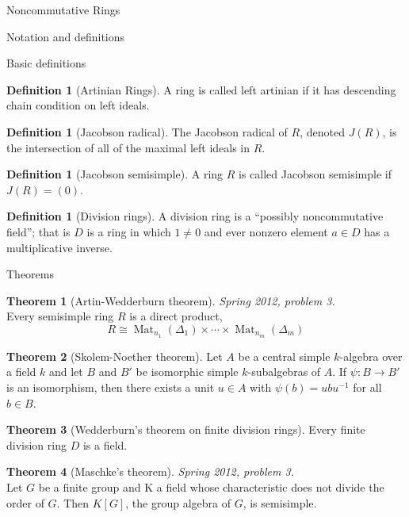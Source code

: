 \documentclass{article}
\theoremstyle{definition}
\newtheorem{theorem}{Theorem}
\numberwithin{theorem}{subsection} %
\theoremstyle{remark}
\theoremstyle{definition}
\newtheorem{definition}[paragraph]{Definition}
\newcommand{\Mat}{\operatorname{Mat}}
\newcommand{\fn}[3]{{#1 \colon #2 \rightarrow #3}}
\begin{document}
\pagebreak
\begin{section}{Noncommutative Rings}
  \begin{subsection}{Notation and definitions}
    \begin{subsubsection}{Basic definitions}
      \begin{definition}[Artinian Rings]
        A ring is called left artinian if it has descending chain condition on
        left ideals.
      \end{definition}
      \begin{definition}[Jacobson radical]
        The Jacobson radical of $R$, denoted $J(R)$, is the intersection of all
        of the maximal left ideals in $R$.
      \end{definition}
      \begin{definition}[Jacobson semisimple]
        A ring $R$ is called Jacobson semisimple if $J(R) = (0)$.
      \end{definition}
      \begin{definition}[Division rings]
        A division ring is a ``possibly noncommutative field''; that is $D$ is a
        ring in which $1 \neq 0$ and ever nonzero element $a \in D$ has a
        multiplicative inverse.
      \end{definition}
    \end{subsubsection}
  \end{subsection}
  \begin{subsection}{Theorems}
    \begin{theorem}[Artin-Wedderburn theorem]
      \textit{Spring 2012, problem 3.} \\
      Every semisimple ring $R$ is a direct product, \[
        R \cong \Mat_{n_1}(\Delta_1) \times \cdots \times \Mat_{n_m}(\Delta_m)
      \]
    \end{theorem}
    \begin{theorem}[Skolem-Noether theorem]
      Let $A$ be a central simple $k$-algebra over a field $k$ and let $B$ and
      $B'$ be isomorphic simple $k$-subalgebras of $A$.
      If $\fn \psi B {B'}$ is an isomorphism, then there exists a unit $u \in A$
      with $\psi(b) = ubu^{-1}$ for all $b \in B$.
    \end{theorem}
    \begin{theorem}[Wedderburn's theorem on finite division rings]
      Every finite division ring $D$ is a field.
    \end{theorem}
    \begin{theorem}[Maschke's theorem]
      \textit{Spring 2012, problem 3.} \\
       Let $G$ be a finite group and K a field whose characteristic does not divide the order of $G$. Then $K[G]$, the group algebra of $G$, is semisimple.
    \end{theorem}
  \end{subsection}
\end{section}
\end{document}
